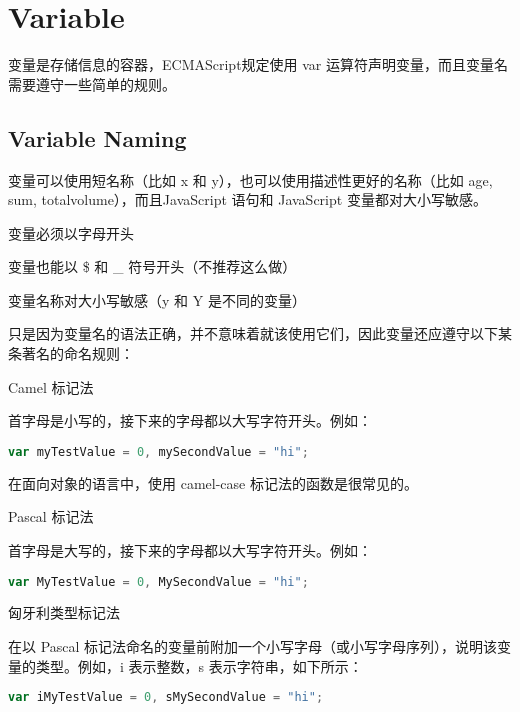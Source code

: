 






\chapter{Variable}

变量是存储信息的容器，ECMAScript规定使用 var 运算符声明变量，而且变量名需要遵守一些简单的规则。

\section{Variable Naming}




变量可以使用短名称（比如 x 和 y），也可以使用描述性更好的名称（比如 age, sum, totalvolume），而且JavaScript 语句和 JavaScript 变量都对大小写敏感。

\begin{compactitem}
\item 变量必须以字母开头
\item 变量也能以 \$ 和 \_ 符号开头（不推荐这么做）
\item 变量名称对大小写敏感（y 和 Y 是不同的变量）
\end{compactitem}

只是因为变量名的语法正确，并不意味着就该使用它们，因此变量还应遵守以下某条著名的命名规则：

\begin{compactitem}
\item Camel 标记法

首字母是小写的，接下来的字母都以大写字符开头。例如：

\begin{lstlisting}[language=JavaScript]
var myTestValue = 0, mySecondValue = "hi";
\end{lstlisting}

在面向对象的语言中，使用 camel-case 标记法的函数是很常见的。


\item Pascal 标记法

首字母是大写的，接下来的字母都以大写字符开头。例如：

\begin{lstlisting}[language=JavaScript]
var MyTestValue = 0, MySecondValue = "hi";
\end{lstlisting}

\item 匈牙利类型标记法

在以 Pascal 标记法命名的变量前附加一个小写字母（或小写字母序列），说明该变量的类型。例如，i 表示整数，s 表示字符串，如下所示：

\begin{lstlisting}[language=JavaScript]
var iMyTestValue = 0, sMySecondValue = "hi";
\end{lstlisting}

\end{compactitem}


